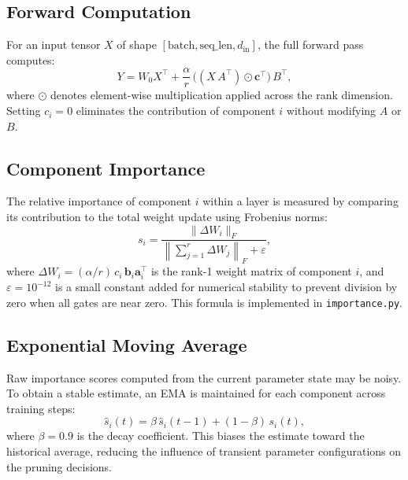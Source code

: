 \documentclass[conference]{IEEEtran}
\begin{document}
\subsection{Forward Computation}
For an input tensor $X$ of shape
$[\text{batch}, \text{seq\_len}, d_{\text{in}}]$, the full
forward pass computes:
\begin{equation}
  Y = W_0 X^{\top}
    + \frac{\alpha}{r}\,\bigl((X\,A^{\top}) \odot
      \mathbf{c}^{\top}\bigr)\,B^{\top},
  \label{eq:forward}
\end{equation}
where $\odot$ denotes element-wise multiplication applied
across the rank dimension. Setting $c_i = 0$ eliminates the
contribution of component $i$ without modifying $A$ or $B$.

\subsection{Component Importance}
The relative importance of component $i$ within a layer is
measured by comparing its contribution to the total weight
update using Frobenius norms:
\begin{equation}
  s_i = \frac{\|\Delta W_i\|_F}
             {\left\|\sum_{j=1}^{r}\Delta W_j\right\|_F + \varepsilon},
  \label{eq:importance}
\end{equation}
where $\Delta W_i = (\alpha/r)\,c_i\,\mathbf{b}_i
\mathbf{a}_i^{\top}$ is the rank-1 weight matrix of component
$i$, and $\varepsilon = 10^{-12}$ is a small constant added
for numerical stability to prevent division by zero when all
gates are near zero. This formula is implemented in
\texttt{importance.py}.

\subsection{Exponential Moving Average}
Raw importance scores computed from the current parameter
state may be noisy. To obtain a stable estimate, an EMA is
maintained for each component across training steps:
\begin{equation}
  \hat{s}_i(t) = \beta\,\hat{s}_i(t-1)
               + (1 - \beta)\,s_i(t),
  \label{eq:ema}
\end{equation}
where $\beta = 0.9$ is the decay coefficient. This biases
the estimate toward the historical average, reducing the
influence of transient parameter configurations on the
pruning decisions.
\end{document}
